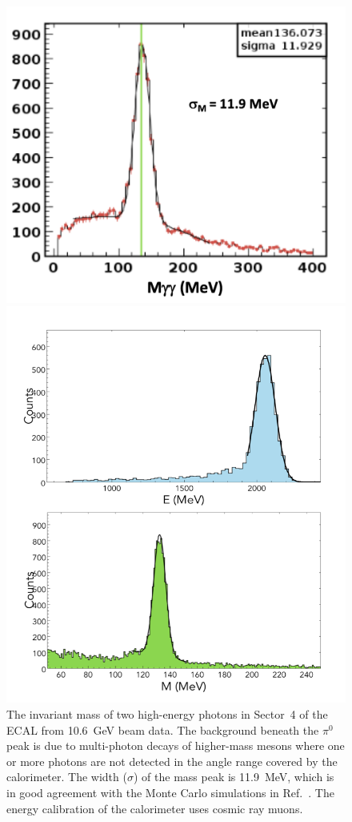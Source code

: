\documentclass[final,3p,twocolumn]{elsarticle}
\begin{document}
\begin{figure}[t!]
\centerline{\includegraphics[width=0.90\columnwidth]{ECAL-2g-mass-fit.png}}
\caption{The invariant mass of two high-energy photons in Sector~4 of the ECAL from 10.6~GeV beam data. The
  background beneath the $\pi^0$ peak is due to multi-photon decays of higher-mass mesons where one or more
  photons are not detected in the angle range covered by the calorimeter. The width ($\sigma$) of the mass peak is
  11.9~MeV, which is in good agreement with the Monte Carlo simulations in Ref.~\cite{Software}. 
  The energy calibration of the calorimeter uses cosmic ray muons.}
\label{gg-ecal}
\centerline{\includegraphics[width=0.90\columnwidth]{FT-performance.png}}

\end{figure}
\end{document}
